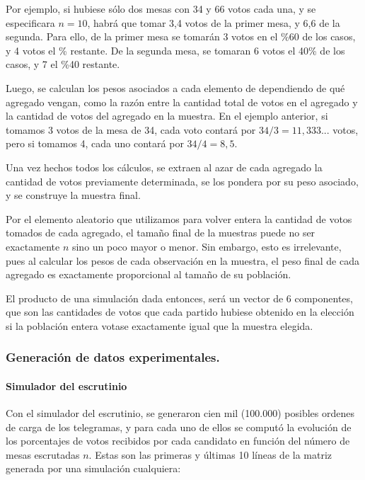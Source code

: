 \documentclass[12pt, a4paper]{article}
\begin{document}
Por ejemplo, si hubiese s\'olo dos mesas con 34 y 66 votos cada una, y se especificara $n=10$, habr\'a que tomar 3,4 votos de la primer mesa, y 6,6 de la segunda. Para ello, de la primer mesa se tomar\'an 3 votos en el \%60 de los casos, y 4 votos el \% restante. De la segunda mesa, se tomaran 6 votos el 40\% de los casos, y 7 el \%40 restante.


Luego, se calculan los pesos asociados a cada elemento de dependiendo de qu\'e agregado vengan, como la raz\'on entre la cantidad total de votos en el agregado y la cantidad de votos del agregado en la muestra. En el ejemplo anterior, si tomamos 3 votos de la mesa de 34, cada voto contar\'a por $34/3 = 11,333...$ votos, pero si tomamos 4, cada uno contar\'a por $34/4 = 8,5$.

Una vez hechos todos los c\'alculos, se extraen al azar de cada agregado la cantidad de votos previamente determinada, se los pondera por su peso asociado, y se construye la muestra final.

Por el elemento aleatorio que utilizamos para volver entera la cantidad de votos tomados de cada agregado, el tama\~no final de la muestras puede no ser exactamente $n$ sino un poco mayor o menor. Sin embargo, esto es irrelevante, pues al calcular los pesos de cada observaci\'on en la muestra, el peso final de cada agregado es exactamente proporcional al tama\~no de su poblaci\'on.

El producto de una simulaci\'on dada entonces, ser\'a un vector de 6 componentes, que son las cantidades de votos que cada partido hubiese obtenido en la elecci\'on si la poblaci\'on entera votase exactamente igual que la muestra elegida.


\subsubsection{Generaci\'on de datos experimentales.}

\paragraph{Simulador del escrutinio}

Con el simulador del escrutinio, se generaron cien mil (100.000) posibles ordenes de carga de los telegramas, y para cada uno de ellos se comput\'o la evoluci\'on de los porcentajes de votos recibidos por cada candidato en funci\'on del n\'umero de mesas escrutadas $n$. Estas son las primeras y \'ultimas 10 l\'ineas de la matriz generada por una simulaci\'on cualquiera:
\end{document}
